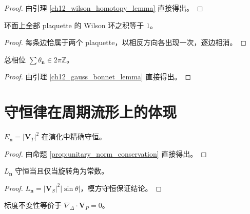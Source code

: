 \begin{proof}
由引理 \ref{ch12_wilson_homotopy_lemma} 直接得出。
\end{proof}

\begin{lemma}\label{ch12_gauss_bonnet_lemma}
环面上全部 plaquette 的 Wilson 环之积等于 $1$。
\end{lemma}

\begin{proof}
每条边恰属于两个 plaquette，以相反方向各出现一次，逐边相消。
\end{proof}

\begin{corollary}[离散通量量子化]\label{ch12_gauss_bonnet_corollary}
总相位 $\sum\theta_{\mathbf{n}}\in 2\pi\mathbb{Z}$。
\end{corollary}

\begin{proof}
由引理 \ref{ch12_gauss_bonnet_lemma} 直接得出。
\end{proof}

\section{守恒律在周期流形上的体现}\label{sec:conservation_periodic_manifolds}

\begin{proposition}[格点上的能量守恒]\label{prop:lattice_energy_conservation}
$E_{\mathbf{n}}=|\mathbf{V}_T|^2$ 在演化中精确守恒。
\end{proposition}

\begin{proof}
由命题 \ref{prop:unitary_norm_conservation} 直接得出。
\end{proof}

\begin{proposition}[格点上的角动量守恒]\label{prop:lattice_angular_momentum_conservation}
$L_{\mathbf{n}}$ 守恒当且仅当旋转角为常数。
\end{proposition}

\begin{proof}
$L_{\mathbf{n}}=|\mathbf{V}_S|^2|\sin\theta|$，模方守恒保证结论。
\end{proof}

\begin{proposition}[格点上的标度不变性]\label{prop:lattice_scale_invariance}
标度不变性等价于 $\nabla_{\Delta}\cdot\mathbf{V}_P=0$。
\end{proposition}

